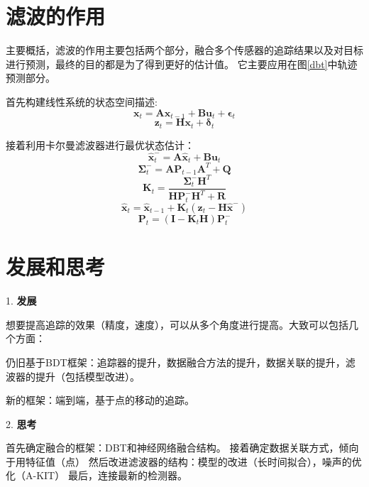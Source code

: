 \section{滤波的作用}
主要概括，滤波的作用主要包括两个部分，融合多个传感器的追踪结果以及对目标进行预测，最终的目的都是为了得到更好的估计值。
它主要应用在图\ref{dbt}中轨迹预测部分。

\begin{tcolorbox}[]
	首先构建线性系统的状态空间描述:
	$$ \mathbf{x}_{t} = \mathbf{A} \mathbf{x}_{t-1} + \mathbf{B} \mathbf{u}_{t} + \bm{\epsilon}_{t} $$
	$$  \mathbf{z}_{t} = \mathbf{H} \mathbf{x}_{t} + \bm{\delta}_{t} $$
	
	接着利用卡尔曼滤波器进行最优状态估计：
	\begin{equation}
		\hat{\bm{x}}_{t}^{-} =  \bm{A} \hat{\bm{x}}_{t} + \bm{B} \bm{u}_t
	\end{equation}
	\begin{equation}
		\bm{\Sigma}_{t}^{-} = \bm{A} \bm{P}_{t-1} \bm{A}^{T} + \bm{Q}
	\end{equation}
	\begin{equation}
		\bm{K}_t = \frac{\bm{\Sigma}_{t}^{-} \bm{H}^{T}}{\bm{H} \bm{P}_{t}^{-} \bm{H}^{T} + \bm{R} }
	\end{equation}
	\begin{equation}
		\hat{\bm{x}}_t = \hat{\bm{x}}_{t-1} + \bm{K}_t(\bm{z}_t - \bm{H} \hat{\bm{x}}^{-})
	\end{equation}
	\begin{equation}
		\bm{P}_t = (\bm{I} - \bm{K}_t \bm{H}) \bm{P}_{t}^{-}
	\end{equation}
	
\end{tcolorbox}

\section{发展和思考}
1. \textbf{发展}

想要提高追踪的效果（精度，速度），可以从多个角度进行提高。大致可以包括几个方面：

仍旧基于BDT框架：追踪器的提升，数据融合方法的提升，数据关联的提升，滤波器的提升（包括模型改进）。

新的框架：端到端\cite{10610979}，基于点的移动的追踪\cite{wu2024moving}。

2. \textbf{思考}

首先确定融合的框架：DBT和神经网络融合结构。
接着确定数据关联方式，倾向于用特征值（点）
然后改进滤波器的结构：模型的改进（长时间拟合），噪声的优化（A-KIT）
最后，连接最新的检测器。

